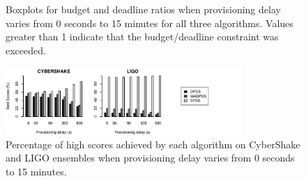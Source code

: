\documentclass[preprint,5p]{elsarticle}
\begin{document}
\begin{figure}[htb]
    \centering
    \hspace{2cm}
    \caption{Boxplots for budget and deadline ratios when provisioning delay 
    varies from 0 seconds to 15 minutes for all three algorithms. Values 
    greater than 1 indicate that the budget/deadline constraint was exceeded.}
    \label{fig:delays}
\end{figure}
\begin{figure}[htb]
  \centering
  \includegraphics[width=0.8\textwidth]{run-finish-delays-test-0-output-distributions-delays}
  \caption{Percentage of high scores achieved by each algorithm on CyberShake and LIGO
  ensembles when provisioning delay varies from 0 seconds to 15 minutes.}
  \label{fig:delays-scores}
\end{figure}
\end{document}

